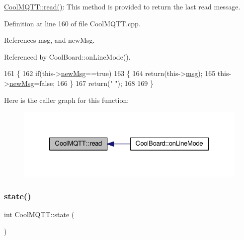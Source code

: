 \hyperlink{classCoolMQTT_ae3c18f6ae9723746d32765f1c8f176ca}{Cool\+M\+Q\+T\+T\+::read()}\+: This method is provided to return the last read message. 

Definition at line 160 of file Cool\+M\+Q\+T\+T.\+cpp.



References msg, and new\+Msg.



Referenced by Cool\+Board\+::on\+Line\+Mode().


\begin{DoxyCode}
161 \{   
162     \textcolor{keywordflow}{if}(this->\hyperlink{classCoolMQTT_a3240388137b885775aadf38e96b24c6b}{newMsg}==\textcolor{keyword}{true})
163     \{
164         \textcolor{keywordflow}{return}(this->\hyperlink{classCoolMQTT_af6b19e7074dbbb4ae493c44dcb53f7ff}{msg});
165         this->\hyperlink{classCoolMQTT_a3240388137b885775aadf38e96b24c6b}{newMsg}=\textcolor{keyword}{false};
166     \}
167     \textcolor{keywordflow}{return}(\textcolor{stringliteral}{" "});
168 
169 \}
\end{DoxyCode}
Here is the caller graph for this function\+:
\nopagebreak
\begin{figure}[H]
\begin{center}
\leavevmode
\includegraphics[width=326pt]{classCoolMQTT_ae3c18f6ae9723746d32765f1c8f176ca_icgraph}
\end{center}
\end{figure}
\mbox{\label{classCoolMQTT_a5d003307eff78efbd585e42b43b72b6d}} 
\subsubsection{\texorpdfstring{state()}{state()}}
{\footnotesize\ttfamily int Cool\+M\+Q\+T\+T\+::state (\begin{DoxyParamCaption}{ }\end{DoxyParamCaption})}

